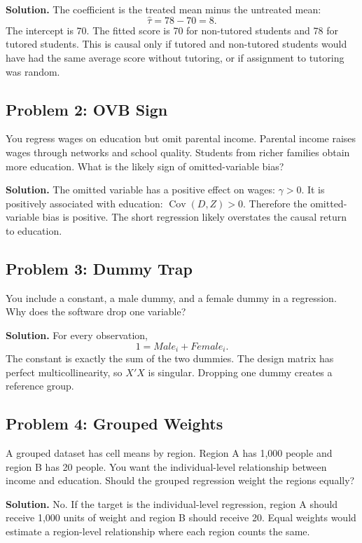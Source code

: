 \textbf{Solution.} The coefficient is the treated mean minus the untreated
mean:
\[
  \hat\tau=78-70=8.
\]
The intercept is 70. The fitted score is 70 for non-tutored students and 78
for tutored students. This is causal only if tutored and non-tutored students
would have had the same average score without tutoring, or if assignment to
tutoring was random.

\subsection{Problem 2: OVB Sign}

You regress wages on education but omit parental income. Parental income
raises wages through networks and school quality. Students from richer
families obtain more education. What is the likely sign of omitted-variable
bias?

\textbf{Solution.} The omitted variable has a positive effect on wages:
$\gamma>0$. It is positively associated with education:
$\operatorname{Cov}(D,Z)>0$. Therefore the omitted-variable bias is positive.
The short regression likely overstates the causal return to education.

\subsection{Problem 3: Dummy Trap}

You include a constant, a male dummy, and a female dummy in a regression. Why
does the software drop one variable?

\textbf{Solution.} For every observation,
\[
  1=Male_i+Female_i.
\]
The constant is exactly the sum of the two dummies. The design matrix has
perfect multicollinearity, so $X'X$ is singular. Dropping one dummy creates a
reference group.

\subsection{Problem 4: Grouped Weights}

A grouped dataset has cell means by region. Region A has 1,000 people and
region B has 20 people. You want the individual-level relationship between
income and education. Should the grouped regression weight the regions
equally?

\textbf{Solution.} No. If the target is the individual-level regression,
region A should receive 1,000 units of weight and region B should receive 20.
Equal weights would estimate a region-level relationship where each region
counts the same.

